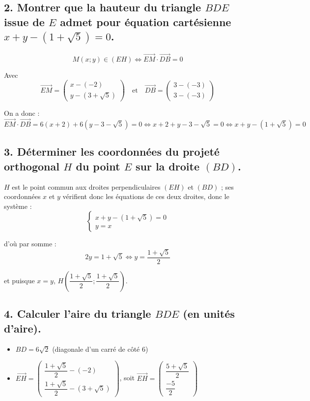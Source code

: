 \documentclass[10pt]{article}
\begin{document}
	\subsection*{2. Montrer que la hauteur du triangle $BDE$ issue de $E$ admet pour équation cartésienne $x + y - (1 + \sqrt{5}) = 0$.}
	
	\[
	M(x; y) \in (EH) \iff \overrightarrow{EM} \cdot \overrightarrow{DB} = 0
	\]
	
	Avec
	\[
	\overrightarrow{EM} = \begin{pmatrix}
		x - (-2) \\
		y - (3 + \sqrt{5})
	\end{pmatrix}
	\quad \text{et} \quad \overrightarrow{DB} = \begin{pmatrix}
		3 - (-3) \\
		3 - (-3)
	\end{pmatrix}
	\]
	
	On a donc :
	\[
	\overrightarrow{EM} \cdot \overrightarrow{DB} = 6(x + 2) + 6(y - 3 - \sqrt{5}) = 0 \iff x + 2 + y - 3 - \sqrt{5} = 0 \iff x + y - (1 + \sqrt{5}) = 0
	\]
	
	\subsection*{3. Déterminer les coordonnées du projeté orthogonal $H$ du point $E$ sur la droite $(BD)$.}
	
	$H$ est le point commun aux droites perpendiculaires $(EH)$ et $(BD)$ ; ses coordonnées $x$ et $y$ vérifient donc les équations de ces deux droites, donc le système :
	\[
	\begin{cases}
		x + y - (1 + \sqrt{5}) = 0 \\
		y = x
	\end{cases}
	\]
	
	d'où par somme :
	\[
	2y = 1 + \sqrt{5} \iff y = \dfrac{1 + \sqrt{5}}{2}
	\]
	
	et puisque $x = y$, $H\left( \dfrac{1 + \sqrt{5}}{2}; \dfrac{1 + \sqrt{5}}{2} \right)$.
	
	\subsection*{4. Calculer l’aire du triangle $BDE$ (en unités d’aire).}
	
	\begin{itemize}
		\item $BD = 6\sqrt{2}$ (diagonale d’un carré de côté 6)
		\item $\overrightarrow{EH} = \begin{pmatrix}
			\dfrac{1 + \sqrt{5}}{2} - (-2) \\
			\dfrac{1 + \sqrt{5}}{2} - (3 + \sqrt{5})
		\end{pmatrix}$, soit $\overrightarrow{EH} = \begin{pmatrix}
			\dfrac{5 + \sqrt{5}}{2} \\
			\dfrac{-5}{2}
		\end{pmatrix}$
	\end{itemize}
	
\end{document}
